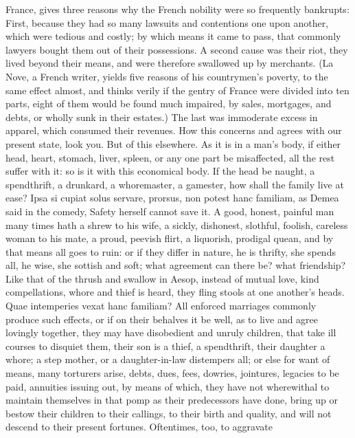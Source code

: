 {France, gives three reasons why the French nobility were so
frequently bankrupts: First, because they had so many lawsuits and
contentions one upon another, which were tedious and costly; by which
means it came to pass, that commonly lawyers bought them out of their
possessions. A second cause was their riot, they lived beyond their
means, and were therefore swallowed up by merchants. (La Nove, a French
writer, yields five reasons of his countrymen's poverty, to the same
effect almost, and thinks verily if the gentry of France were divided
into ten parts, eight of them would be found much impaired, by sales,
mortgages, and debts, or wholly sunk in their estates.) The last was
immoderate excess in apparel, which consumed their revenues. How this
concerns and agrees with our present state, look you. But of this
elsewhere. As it is in a man's body, if either head, heart, stomach,
liver, spleen, or any one part be misaffected, all the rest suffer with
it: so is it with this economical body. If the head be naught, a
spendthrift, a drunkard, a whoremaster, a gamester, how shall the
family live at ease? Ipsa si cupiat solus servare, prorsus, non
potest hanc familiam, as Demea said in the comedy, Safety herself
cannot save it. A good, honest, painful man many times hath a shrew to
his wife, a sickly, dishonest, slothful, foolish, careless woman to his
mate, a proud, peevish flirt, a liquorish, prodigal quean, and by that
means all goes to ruin: or if they differ in nature, he is thrifty, she
spends all, he wise, she sottish and soft; what agreement can there be?
what friendship? Like that of the thrush and swallow in Aesop, instead
of mutual love, kind compellations, whore and thief is heard, they
fling stools at one another's heads. Quae intemperies vexat hanc
familiam? All enforced marriages commonly produce such effects, or if
on their behalves it be well, as to live and agree lovingly together,
they may have disobedient and unruly children, that take ill courses to
disquiet them, their son is a thief, a spendthrift, their daughter
a whore; a step mother, or a daughter-in-law distempers all;
or else for want of means, many torturers arise, debts, dues,
fees, dowries, jointures, legacies to be paid, annuities issuing out,
by means of which, they have not wherewithal to maintain themselves in
that pomp as their predecessors have done, bring up or bestow their
children to their callings, to their birth and quality, and will
not descend to their present fortunes. Oftentimes, too, to aggravate
}
